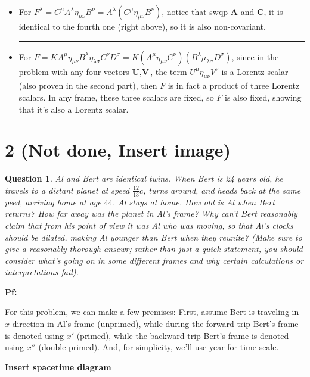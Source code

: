 \documentclass{article}
\newtheorem{question}{Question}
\begin{document}
\begin{itemize}
    \rule{15.6cm}{0,1mm}

    \item For $F^\lambda = C^\mu A^\lambda \eta_{\mu\nu}B^\nu = A^\lambda(C^\mu\eta_{\mu\nu}B^\nu)$, notice that swqp $\textbf{A}$ and $\textbf{C}$, it is identical to the fourth one (right above), so it is also non-covariant.
    
    \rule{15.6cm}{0,1mm}

    \item For $F=KA^\mu \eta_{\mu\nu}B^\lambda \eta_{\lambda\sigma}C^\nu D^\sigma = K(A^\mu\eta_{\mu\nu}C^\nu)(B^\lambda\mu_{\lambda\sigma}D^\sigma)$, since in the problem with any four vectors $\textbf{U},\textbf{V}$, the term $U^\mu\eta_{\mu\nu}V^\nu$ is a Lorentz scalar (also proven in the second part), then $F$ is in fact a product of three Lorentz scalars. In any frame, these three scalars are fixed, so $F$ is also fixed, showing that it's also a Lorentz scalar.
\end{itemize}

\break

\section*{2 (Not done, Insert image)}
\begin{question}\label{q2}
    Al and Bert are identical twins. When Bert is 24 years old, he travels to a distant planet at speed $\frac{12}{13}c$, turns around, and heads back at the same peed, arriving home at age $44$. Al stays at home. How old is Al when Bert returns? How far away was the planet in Al's frame? Why can't Bert reasonably claim that from his point of view it was Al who was moving, so that Al's clocks should be dilated, making Al younger than Bert when they reunite? (Make sure to give a reasonably thorough ansewr; rather than just a quick statement, you should consider what's going on in some different frames and why certain calculations or interpretations fail).
\end{question}

\textbf{Pf:}

For this problem, we can make a few premises: First, assume Bert is traveling in $x$-direction in Al's frame (unprimed), while during the forward trip Bert's frame is denoted using $x'$ (primed), while the backward trip Bert's frame is denoted using $x''$ (double primed). And, for simplicity, we'll use year for time scale.

\textbf{Insert spacetime diagram}
\end{document}
